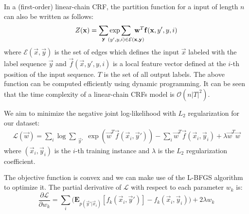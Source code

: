 In a (first-order) linear-chain CRF, the partition function for a input of length $n$ can also be written as follows:
\begin{equation}
Z(\mathbf{x}) = \sum_{\mathbf{y}}\exp\smashoperator{\sum_{(y',y,i)\in\mathcal{E}(\mathbf{x}, \mathbf{y})}}\ \mathbf{w}^T\mathbf{f}(\vec{x}, y',y,i)
\end{equation}
where $\mathcal{E}(\vec{x}, \vec{y})$ is the set of edges which defines the input $\vec{x}$ labeled with the label sequence $\vec{y}$ and $\vec{f}(\vec{x},y', y,i)$ is a local feature vector defined at the $i$-th position of the input sequence.
$T$ is the set of all output labels.
The above function can be computed efficiently using dynamic programming.
It can be seen that the time complexity of a linear-chain CRFs model is $\mathcal{O}(n|T|^{2})$.

We aim to minimize the negative joint log-likelihood with $\textit{L}_{2}$ regularization for our dataset:
\begin{equation}
\begin{split}
\mathcal{L}(\vec{w}) =  \sum_{i}\log\sum_{\substack{\vec{y}{'} } }\exp(\vec{w}^{T}\vec{f}(\vec{x}_{i},\vec{y}{'}))  - \sum_{i}\vec{w}^{T}\vec{f}(\vec{x}_{i},\vec{y}_{i}) + \lambda \vec{w}^{T}\vec{w}
\end{split}
\end{equation} 
where $(\vec{x}_{i},\vec{y}_{i})$ is the $i$-th training instance and $\lambda$ is the $L_{2}$ regularization coefficient.

The objective function is convex and we can make use of the L-BFGS \cite{byrd1995limited} algorithm to optimize it.
The partial derivative of $\mathcal{L}$ with respect to each parameter $w_{k}$ is:
\begin{equation}
\frac{\partial\mathcal{L}}{\partial w_{k}}  = \sum_i\Big(\mathbf{E}_{p(\vec{y}{'}|\vec{x}_{i})} \left [f_{k}(\vec{x}_{i}, \vec{y}{'})    \right ] -  f_{k}(\vec{x}_{i}, \vec{y}_{i})\Big) + 2\lambda w_{k}\nonumber
\end{equation}



